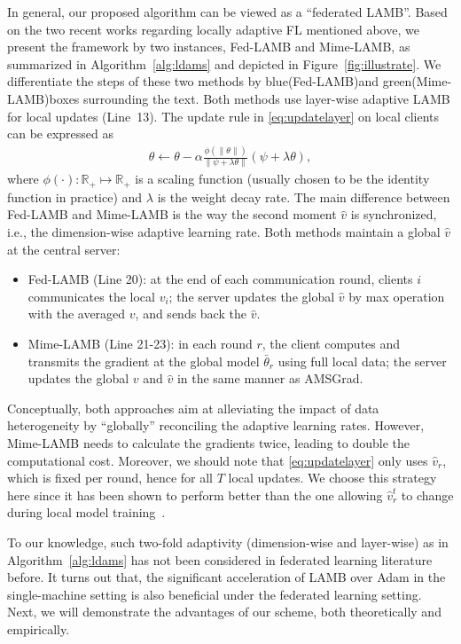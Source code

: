 \documentclass[nohyperref]{article}
\theoremstyle{plain}
\theoremstyle{definition}
\theoremstyle{remark}
\begin{document}
In general, our proposed algorithm can be viewed as a ``federated LAMB''. 
Based on the two recent works regarding locally adaptive FL mentioned above, we present the framework by two instances, Fed-LAMB and Mime-LAMB, as summarized in Algorithm~\ref{alg:ldams} and depicted in Figure~\ref{fig:illustrate}. We differentiate the steps of these two methods by blue\colorbox{blue!20!white}{(Fed-LAMB)}and green\colorbox{green!20!white}{(Mime-LAMB)}boxes surrounding the text. Both methods use layer-wise adaptive LAMB for local updates (Line~13). The update rule in \eqref{eq:updatelayer} on local clients can be expressed as
\begin{align*}
    \theta \leftarrow \theta-\alpha\frac{\phi(\|\theta\|)}{\|\psi+\lambda\theta\|}(\psi+\lambda\theta),
\end{align*}
where $\phi(\cdot): \mathbb R_+ \mapsto \mathbb R_+$ is a scaling function (usually chosen to be the identity function in practice) and $\lambda$ is the weight decay rate. The main difference between Fed-LAMB and Mime-LAMB is the way the second moment $\hat v$ is synchronized, i.e., the dimension-wise adaptive learning rate. 
Both methods maintain a global $\hat v$ at the central server:
\begin{itemize}
    \item \colorbox{blue!20!white}{Fed-LAMB (Line 20)}: at the end of each communication round, clients $i$ communicates the local $v_{i}$; the server updates the global $\hat v$ by max operation with the averaged $v$, and sends back the $\hat v$.
    
    \item \colorbox{green!20!white}{Mime-LAMB (Line 21-23)}: in each round $r$, the client computes and transmits the gradient at the global model $\bar\theta_r$ using full local data; the server updates the global $v$ and $\hat v$ in the same manner as AMSGrad. 
\end{itemize}
Conceptually, both approaches aim at alleviating the impact of data heterogeneity by ``globally'' reconciling the adaptive learning rates. However, Mime-LAMB needs to calculate the gradients twice, leading to double the computational cost. Moreover, we should note that \eqref{eq:updatelayer} only uses $\hat v_r$, which is fixed per round, hence for all $T$ local updates. 
We choose this strategy here since it has been shown to perform better than the one allowing $\hat v_r^t$ to change during local model training~\cite{karimireddy2020mime}.

To our knowledge, such two-fold adaptivity (dimension-wise and layer-wise) as in Algorithm~\ref{alg:ldams} has not been considered in federated learning literature before. It turns out that, the significant acceleration of LAMB over Adam in the single-machine setting is also beneficial under the federated learning setting. Next, we will demonstrate the advantages of our scheme, both theoretically and empirically.
\end{document}
